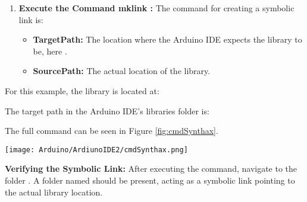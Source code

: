 {\begin{enumerate}
\begin{center}\centering
	\texttt{[image: Arduino/ArdiunoIDE2/mklinkCmd.png]}
	\label{fig:cmdLink}		
\end{center}





\item \textbf{Execute the Command mklink :} The command for creating a symbolic link is: {\small {}}

\begin{itemize}
	\item 	\textbf{TargetPath:} The location where the Arduino IDE expects the library to be, here .
	\item 	\textbf{SourcePath:} The actual location of the library.
\end{itemize}
		
			
\end{enumerate}
		
\bigskip

		
For this example, the library is located at: 


{\small{}}

\medskip


The target path in the Arduino IDE’s libraries folder is: 


{\small{}}

\medskip

The full command can be seen in Figure \ref{fig:cmdSynthax}.

\begin{center}\centering
	\texttt{[image: Arduino/ArdiunoIDE2/cmdSynthax.png]}
	\label{fig:cmdSynthax}		
\end{center}


\textbf{Verifying the Symbolic Link:} After executing the command, navigate to the folder . A folder named  should be present, acting as a symbolic link pointing to the actual library location.









}
